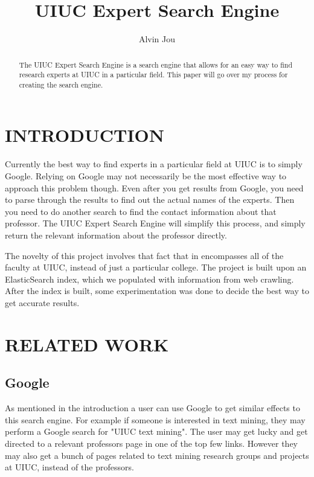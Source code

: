 \documentclass[letterpaper, 10 pt, conference]{ieeeconf}
\title{\LARGE \bf UIUC Expert Search Engine}
\author{Alvin Jou}
\begin{document}
	\maketitle
	\thispagestyle{empty}
	\pagestyle{empty}

	\begin{abstract}
	The UIUC Expert Search Engine is a search engine that allows for an easy way to find research experts at UIUC in a particular field. This paper will go over my process for creating the search engine.

	\end{abstract}

	\section{INTRODUCTION}
	Currently the best way to find experts in a particular field at UIUC is to simply Google. Relying on Google may not necessarily be the most effective way to approach this problem though. Even after you get results from Google, you need to parse through the results to find out the actual names of the experts. Then you need to do another search to find the contact information about that professor. The UIUC Expert Search Engine will simplify this process, and simply return the relevant information about the professor directly.

	The novelty of this project involves that fact that in encompasses all of the faculty at UIUC, instead of just a particular college. The project is built upon an ElasticSearch index, which we populated with information from web crawling. After the index is built, some experimentation was done to decide the best way to get accurate results.

	\section{RELATED WORK}
		\subsection{Google}
		As mentioned in the introduction a user can use Google to get similar effects to this search engine. For example if someone is interested in text mining, they may perform a Google search for "UIUC text mining". The user may get lucky and get directed to a relevant professors page in one of the top few links. However they may also get a bunch of pages related to text mining research groups and projects at UIUC, instead of the professors.
\end{document}
